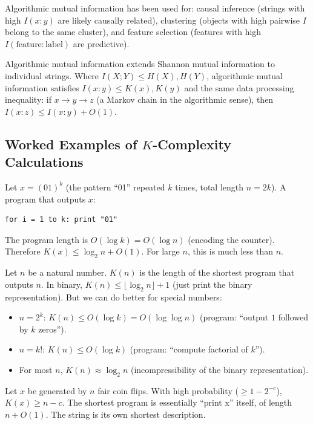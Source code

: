 Algorithmic mutual information has been used for: causal inference (strings with high $I(x:y)$ are likely causally related), clustering (objects with high pairwise $I$ belong to the same cluster), and feature selection (features with high $I(\text{feature}:\text{label})$ are predictive).

Algorithmic mutual information extends Shannon mutual information to individual strings. Where $I(X;Y) \le H(X), H(Y)$, algorithmic mutual information satisfies $I(x:y) \le K(x), K(y)$ and the same data processing inequality: if $x \to y \to z$ (a Markov chain in the algorithmic sense), then $I(x:z) \le I(x:y) + O(1)$.

\subsection{Worked Examples of \texorpdfstring{$K$}{K}-Complexity Calculations}
\label{sec:kolmogorov:examples}

\begin{example}
Let $x = (01)^k$ (the pattern ``01'' repeated $k$ times, total length $n = 2k$). A program that outputs $x$:
\begin{verbatim}
for i = 1 to k: print "01"
\end{verbatim}
The program length is $O(\log k) = O(\log n)$ (encoding the counter). Therefore $K(x) \le \log_2 n + O(1)$. For large $n$, this is much less than $n$.
\end{example}

\begin{example}
Let $n$ be a natural number. $K(n)$ is the length of the shortest program that outputs $n$. In binary, $K(n) \le \lfloor \log_2 n \rfloor + 1$ (just print the binary representation). But we can do better for special numbers:
\begin{itemize}
\item $n = 2^k$: $K(n) \le O(\log k) = O(\log \log n)$ (program: ``output $1$ followed by $k$ zeros'').
\item $n = k!$: $K(n) \le O(\log k)$ (program: ``compute factorial of $k$'').
\item For most $n$, $K(n) \approx \log_2 n$ (incompressibility of the binary representation).
\end{itemize}
\end{example}

\begin{example}
Let $x$ be generated by $n$ fair coin flips. With high probability ($\ge 1 - 2^{-c}$), $K(x) \ge n - c$. The shortest program is essentially ``print x'' itself, of length $n + O(1)$. The string is its own shortest description.
\end{example}


